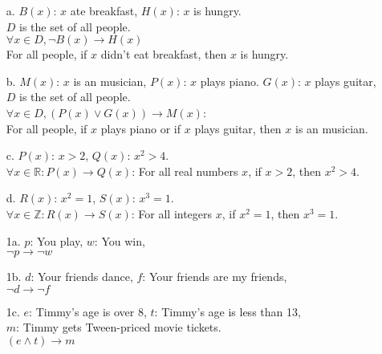 {\begin{questionNOGRADE}{\thequestion}
        \begin{enumerate}
            \item[a.] $B(x)$: $x$ ate breakfast, $H(x)$: $x$ is hungry. \\
                $D$ is the set of all people. \\
                $\forall x \in D, \neg B(x) \to H(x)$ \\
                For all people, if $x$ didn't eat breakfast, then $x$ is hungry.
            \item[b.] $M(x)$: $x$ is an musician, $P(x)$: $x$ plays piano. $G(x)$: $x$ plays guitar, \\
                $D$ is the set of all people. \\
                $\forall x \in D, (P(x) \lor G(x)) \to M(x)$: \\
                For all people, if $x$ plays piano or if $x$ plays guitar, then $x$ is an musician.
            \item[c.] $P(x)$: $x > 2$, $Q(x)$: $x^{2}  > 4$. \\
                $\forall x \in \mathbb{R}: P(x) \to Q(x)$:
                For all real numbers $x$, if $x > 2$, then $x^{2} > 4$.
            \item[d.] $R(x)$: $x^{2} = 1$, $S(x)$: $x^{3} = 1$. \\
                $\forall x \in \mathbb{Z}: R(x) \to S(x)$:
                For all integers $x$, if $x^{2} = 1$, then $x^{3} = 1$.
        \end{enumerate}        
    \end{questionNOGRADE}






}{

\begin{enumerate}
    \item[1a.]  $p$: You play, $w$: You win, \\
                $\neg p \to \neg w$
                
    \item[1b.]  $d$: Your friends dance, $f$: Your friends are my friends,\\
                $\neg d \to \neg f$
                
    \item[1c.]  $e$: Timmy's age is over 8, $t$: Timmy's age is less than 13, \\
                $m$: Timmy gets Tween-priced movie tickets. \\
                $(e \land t) \to m$
                

\end{enumerate}}
